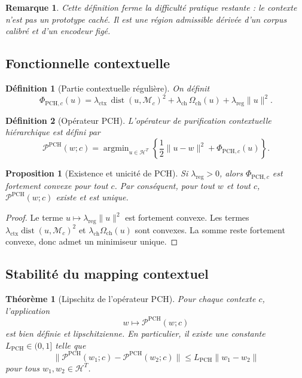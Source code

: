\documentclass[11pt,a4paper]{article}
\newtheorem{definition}{Définition}[section]
\newtheorem{proposition}{Proposition}[section]
\newtheorem{theorem}{Théorème}[section]
\newtheorem{remark}{Remarque}[section]
\DeclareMathOperator{\argmin}{argmin}
\DeclareMathOperator{\dist}{dist}
\newcommand{\Hh}{\mathcal H}
\newcommand{\Pcal}{\mathcal P}
\newcommand{\Mcal}{\mathcal M}
\newcommand{\1}{\mathbf 1}
\begin{document}
\begin{remark}
Cette définition ferme la difficulté pratique restante : le contexte n'est pas un prototype caché.  
Il est une région admissible dérivée d'un corpus calibré et d'un encodeur figé.
\end{remark}

\subsection{Fonctionnelle contextuelle}

\begin{definition}[Partie contextuelle régulière]
On définit
\[
\Phi_{\mathrm{PCH},c}(u)
=
\lambda_{\mathrm{ctx}}\,\dist(u,\Mcal_c)^2
+
\lambda_{\mathrm{ch}}\,\Omega_{\mathrm{ch}}(u)
+
\lambda_{\mathrm{reg}}\|u\|^2.
\]
\end{definition}

\begin{definition}[Opérateur PCH]
L'opérateur de purification contextuelle hiérarchique est défini par
\[
\Pcal^{\mathrm{PCH}}(w;c)
=
\argmin_{u\in\Hh^T}
\left\{
\frac12\|u-w\|^2+\Phi_{\mathrm{PCH},c}(u)
\right\}.
\]
\end{definition}

\begin{proposition}[Existence et unicité de PCH]
Si \(\lambda_{\mathrm{reg}}>0\), alors \(\Phi_{\mathrm{PCH},c}\) est fortement convexe pour tout \(c\).  
Par conséquent, pour tout \(w\) et tout \(c\), \(\Pcal^{\mathrm{PCH}}(w;c)\) existe et est unique.
\end{proposition}

\begin{proof}
Le terme \(u\mapsto \lambda_{\mathrm{reg}}\|u\|^2\) est fortement convexe.  
Les termes \(\lambda_{\mathrm{ctx}}\dist(u,\Mcal_c)^2\) et \(\lambda_{\mathrm{ch}}\Omega_{\mathrm{ch}}(u)\) sont convexes.  
La somme reste fortement convexe, donc admet un minimiseur unique.
\end{proof}

\subsection{Stabilité du mapping contextuel}

\begin{theorem}[Lipschitz de l'opérateur PCH]
Pour chaque contexte \(c\), l'application
\[
w\longmapsto \Pcal^{\mathrm{PCH}}(w;c)
\]
est bien définie et lipschitzienne.  
En particulier, il existe une constante \(L_{\mathrm{PCH}}\in(0,1]\) telle que
\[
\|\Pcal^{\mathrm{PCH}}(w_1;c)-\Pcal^{\mathrm{PCH}}(w_2;c)\|
\le
L_{\mathrm{PCH}}\|w_1-w_2\|
\]
pour tous \(w_1,w_2\in\Hh^T\).
\end{theorem}
\end{document}
